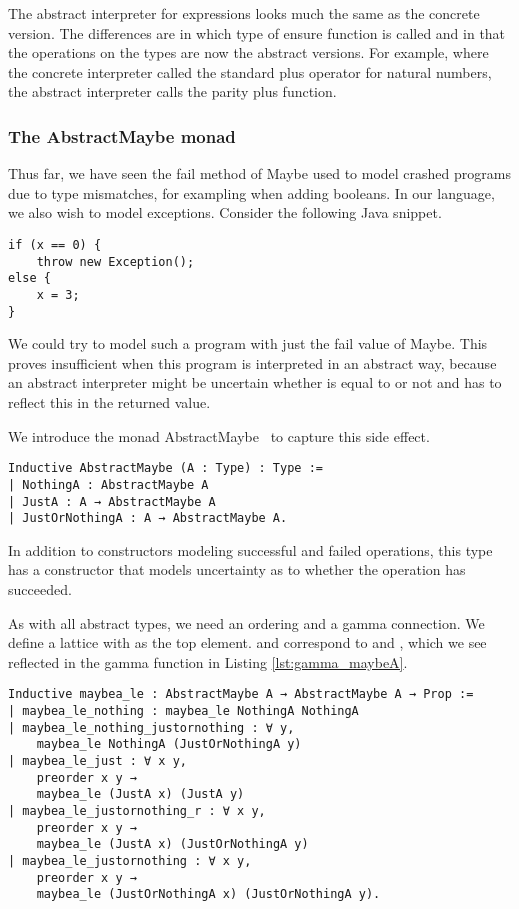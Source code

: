 The abstract interpreter for expressions looks much the same as the concrete
version. The differences are in which type of ensure function is called and in
that the operations on the types are now the abstract versions. For example,
where the concrete interpreter called the standard plus operator for natural
numbers, the abstract interpreter calls the parity plus function.

\subsubsection{The AbstractMaybe monad}
Thus far, we have seen the fail method of Maybe used to model crashed programs
due to type mismatches, for exampling when adding booleans. In our language, we
also wish to model exceptions. Consider the following Java snippet.

\begin{verbatim}
if (x == 0) {
    throw new Exception();
else {
    x = 3;
}
\end{verbatim}

We could try to model such a program with just the fail value of Maybe. 
This proves insufficient when this program is interpreted in an abstract way, 
because an abstract interpreter might be uncertain whether  is equal to 
 or not and has to reflect this in the returned value.

We introduce the monad AbstractMaybe~\cite{keidel2018compositional} 
to capture this side effect.

\begin{verbatim}
Inductive AbstractMaybe (A : Type) : Type :=
| NothingA : AbstractMaybe A
| JustA : A → AbstractMaybe A
| JustOrNothingA : A → AbstractMaybe A.
\end{verbatim}

In addition to constructors modeling successful and failed operations, this
type has a constructor that models uncertainty as to whether the operation has
succeeded.

As with all abstract types, we need an ordering and a gamma connection. We
define a lattice with  as the top element.  and
 correspond to  and , which we see reflected
in the gamma function in Listing \ref{lst:gamma_maybeA}.

\begin{listing}
\begin{verbatim}
Inductive maybea_le : AbstractMaybe A → AbstractMaybe A → Prop :=
| maybea_le_nothing : maybea_le NothingA NothingA
| maybea_le_nothing_justornothing : ∀ y, 
    maybea_le NothingA (JustOrNothingA y)
| maybea_le_just : ∀ x y, 
    preorder x y → 
    maybea_le (JustA x) (JustA y)
| maybea_le_justornothing_r : ∀ x y, 
    preorder x y →
    maybea_le (JustA x) (JustOrNothingA y)
| maybea_le_justornothing : ∀ x y, 
    preorder x y →
    maybea_le (JustOrNothingA x) (JustOrNothingA y).
\end{verbatim}
\end{listing}

